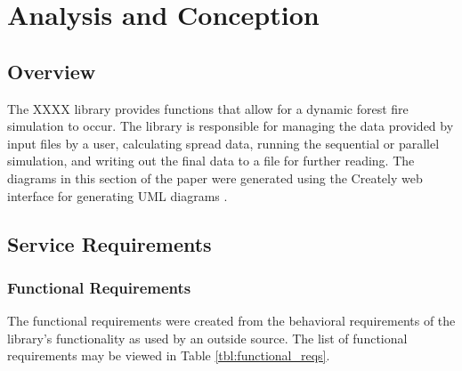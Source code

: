 \chapter{Analysis and Conception}
\label{chapter:design}

\section{Overview}
The XXXX library provides functions that allow for a dynamic forest fire simulation to occur. The library is responsible for managing the data provided by input files by a user, calculating spread data, running the sequential or parallel simulation, and writing out the final data to a file for further reading. The diagrams in this section of the paper were generated using the Creately web interface for generating UML diagrams \cite{creately}. 

\section{Service Requirements}

\subsection{Functional Requirements}
The functional requirements were created from the behavioral requirements of the library's functionality as used by an outside source. The list of functional requirements may be viewed in Table \ref{tbl:functional_reqs}.

